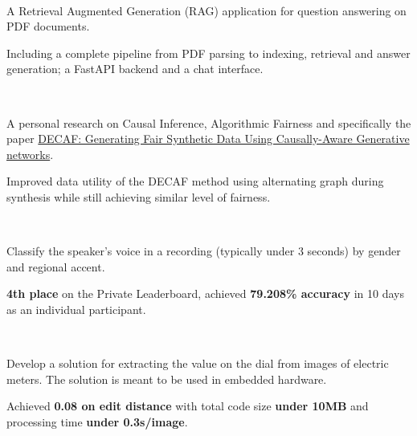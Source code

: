 \\
\begin{zitemize}
    \item A Retrieval Augmented Generation (RAG) application for question answering on PDF
    documents.
    \item Including a complete pipeline from PDF parsing to indexing, retrieval and
    answer generation; a FastAPI backend and a chat interface.
\end{zitemize}


\\
\begin{zitemize}
    \item A personal research on Causal Inference, Algorithmic Fairness and specifically the paper \href{https://arxiv.org/abs/2110.12884}{DECAF: Generating Fair Synthetic Data Using Causally-Aware Generative networks}.
    \item Improved data utility of the DECAF method using alternating graph during synthesis while still achieving similar level of  fairness.
\end{zitemize}

\\
\begin{zitemize}
    \item Classify the speaker's voice in a recording (typically under 3 seconds) by gender and regional accent.
    \item \textbf{4th place} on the Private Leaderboard, achieved \textbf{79.208\%
        accuracy} in 10 days as an individual participant.
\end{zitemize}

\\
\begin{zitemize}
    \item Develop a solution for extracting the value on the dial from images of electric meters. The solution is meant to be used in embedded hardware.
    \item Achieved \textbf{0.08 on edit distance} with total code size
    \textbf{under 10MB} and processing time \textbf{under 0.3s/image}.
\end{zitemize}



